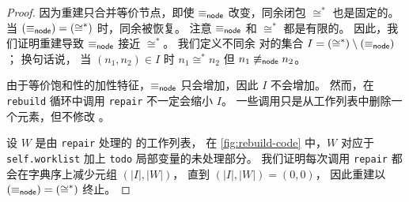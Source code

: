 \begin{proof}
  因为重建只合并等价节点，即使 $\equiv_{\sf node}$ 改变，同余闭包 $\cong^{*}$ 也是固定的。
  当 $(\equiv_{\sf node}) = (\cong^*)$ 时，同余被恢复。
  注意 $\equiv_{\sf node}$ 和 $\cong^*$ 都是有限的。
  因此，我们证明重建导致 $\equiv_{\sf node}$ 接近 $\cong^*$。
  我们定义不同余 \enode 对的集合 $I = (\cong^*) \setminus (\equiv_{\sf node})$；
  换句话说，
    当 $(n_{1}, n_{2}) \in I$ 时 
    $n_{1} \cong^{*} n_{2}$ 
    但 $n_{1} \not\equiv_{\sf node} n_{2}$。

  由于等价饱和性的加性特征，$\equiv_{\sf node}$ 只会增加，因此 $I$ 不会增加。
  然而，在 \texttt{rebuild} 循环中调用 \texttt{repair} 不一定会缩小 $I$。
  一些调用只是从工作列表中删除一个元素，但不修改 \egraph。

  设 $W$ 是由 \texttt{repair} 处理的 \eclasses 的工作列表，
  在 \autoref{fig:rebuild-code} 中，$W$ 对应于 \texttt{self.worklist} 加上 
    \texttt{todo} 局部变量的未处理部分。
  我们证明每次调用 \texttt{repair} 都会在字典序上减少元组 $(|I|, |W|)$，
    直到 $(|I|, |W|) = (0, 0)$，
    因此重建以 $(\equiv_{\sf node}) = (\cong^*)$ 终止。


\end{proof}
